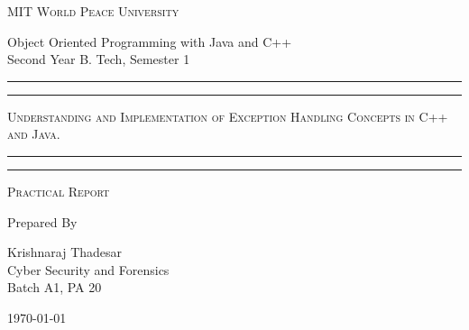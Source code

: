 \documentclass[11pt]{article}
\begin{document}
\begin{titlepage}
	\centering


	\huge\textsc{
		MIT World Peace University
	}\\

	\vspace{0.75\baselineskip} %

	\LARGE{
		Object Oriented Programming with Java and C++\\
		Second Year B. Tech, Semester 1
	}

	\vfill %


	\rule{\textwidth}{1.6pt}\vspace*{-\baselineskip}\vspace*{2pt}
	\rule{\textwidth}{0.6pt}
	\vspace{0.75\baselineskip} %



	\huge{\textsc{
			Understanding and Implementation of Exception Handling Concepts in C++ and Java.
		}} \\



	\vspace{0.5\baselineskip} %
	\rule{\textwidth}{0.6pt}\vspace*{-\baselineskip}\vspace*{2.8pt}
	\rule{\textwidth}{1.6pt}

	\vspace{1\baselineskip} %


	\LARGE\textsc{
		Practical Report
	} %
	\vfill


	Prepared By
	\vspace{0.5\baselineskip} %

	\Large{
		Krishnaraj Thadesar \\
		Cyber Security and Forensics\\
		Batch A1, PA 20
	}


	\vspace{0.5\baselineskip} %
	\today

\end{titlepage}
\end{document}
